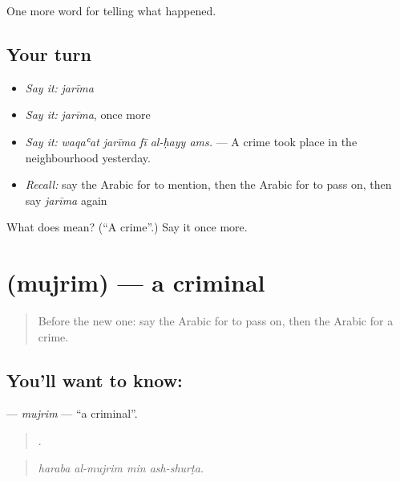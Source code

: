 \begin{grammarlens}[title={What you've built}]
One more word for telling what happened.
\end{grammarlens}

\subsection*{Your turn}
\begin{itemize}
\raggedright
  \item \emph{Say it:} \emph{jarīma}
  \item \emph{Say it:} \emph{jarīma}, once more
  \item \emph{Say it:} \emph{waqaʿat jarīma fī al-ḥayy ams.} — A crime took place in the neighbourhood yesterday.
  \item \emph{Recall:} say the Arabic for to mention, then the Arabic for to pass on, then say \emph{jarīma} again
\end{itemize}

\begin{tcolorbox}[breakable,colback=teal!4,colframe=teal!35!black,title={Before you move on}]
What does  mean? (\textquotedblleft{}A crime\textquotedblright{}.) Say it once more.
\end{tcolorbox}
\section[\texorpdfstring{\ar{مجرم} (mujrim)}{مجرم (mujrim)}]{ (mujrim) — a criminal}

\label{lesson:AR-C300-mujrim}



\begin{quote}
Before the new one: say the Arabic for to pass on, then the Arabic for a crime.
\end{quote}

\subsection*{You'll want to know: }
\textbf{} — \emph{mujrim} — \textquotedblleft{}a criminal\textquotedblright{}.

\begin{quote}
   .
\end{quote}

\begin{quote}
\emph{haraba al-mujrim min ash-shurṭa.}
\end{quote}

